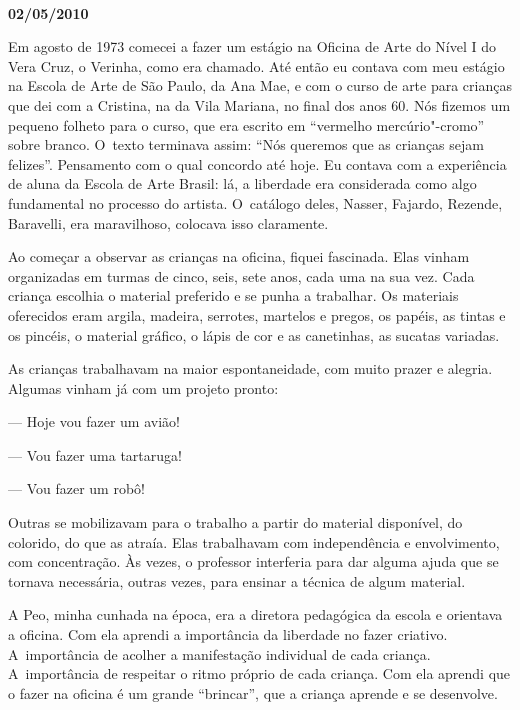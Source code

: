 \begin{center}\asterisc{}​\end{center}

\begin{flushright}\textbf{02/05/2010}\end{flushright}


Em agosto de 1973 comecei a fazer um estágio na Oficina de Arte do Nível
I do Vera Cruz, o Verinha, como era chamado. Até então eu contava com
meu estágio na Escola de Arte de São Paulo, da Ana Mae, e com o curso de
arte para crianças que dei com a Cristina, na  da Vila Mariana, no
final dos anos 60. Nós fizemos um pequeno folheto para o curso, que era
escrito em ``vermelho mercúrio"-cromo'' sobre branco. O~texto terminava
assim: ``Nós queremos que as crianças sejam felizes''. Pensamento com o
qual concordo até hoje. Eu contava com a experiência de aluna da Escola
de Arte Brasil: lá, a liberdade era considerada como algo fundamental no
processo do artista. O~catálogo deles, Nasser, Fajardo, Rezende,
Baravelli, era maravilhoso, colocava isso claramente.

Ao começar a observar as crianças na oficina, fiquei fascinada. Elas
vinham organizadas em turmas de cinco, seis, sete anos, cada uma na sua
vez. Cada criança escolhia o material preferido e se punha a trabalhar.
Os materiais oferecidos eram argila, madeira, serrotes, martelos e
pregos, os papéis, as tintas e os pincéis, o material gráfico, o lápis
de cor e as canetinhas, as sucatas variadas.

As crianças trabalhavam na maior espontaneidade, com muito prazer e
alegria. Algumas vinham já com um projeto pronto:

--- Hoje vou fazer um avião!

--- Vou fazer uma tartaruga!

--- Vou fazer um robô!

Outras se mobilizavam para o trabalho a partir do material disponível,
do colorido, do que as atraía. Elas trabalhavam com independência e
envolvimento, com concentração. Às vezes, o professor interferia para
dar alguma ajuda que se tornava necessária, outras vezes, para ensinar a
técnica de algum material.

A Peo, minha cunhada na época, era a diretora pedagógica da escola e
orientava a oficina. Com ela aprendi a importância da liberdade no fazer
criativo. A~importância de acolher a manifestação individual de cada
criança. A~importância de respeitar o ritmo próprio de cada criança. Com
ela aprendi que o fazer na oficina é um grande ``brincar'', que a
criança aprende e se desenvolve.

